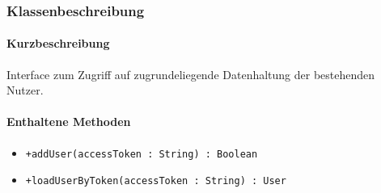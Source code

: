 \subsubsection*{Klassenbeschreibung}%
\paragraph*{Kurzbeschreibung}
Interface zum Zugriff auf zugrundeliegende Datenhaltung der bestehenden Nutzer.
\paragraph*{Enthaltene Methoden}
\begin{itemize}
    \item \texttt{+addUser(accessToken : String) : Boolean}
    \item \texttt{+loadUserByToken(accessToken : String) : User}
\end{itemize}
